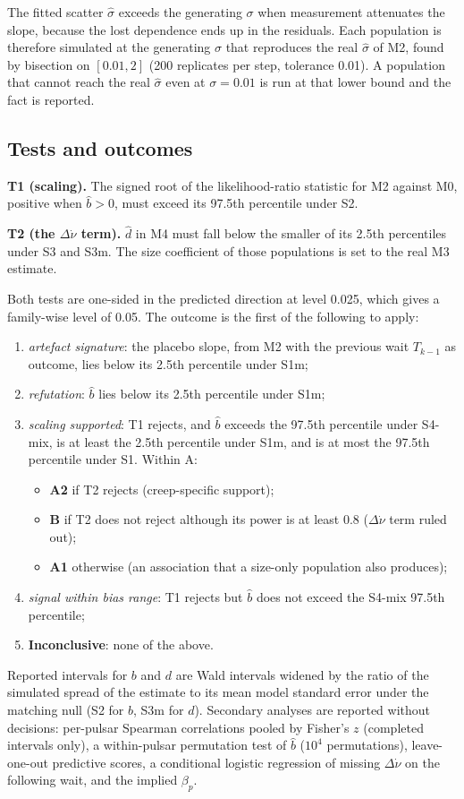 \documentclass[fleqn,usenatbib]{mnras}
\newcommand{\bhat}{\hat b}
\newcommand{\dhat}{\hat d}
\newcommand{\shat}{\hat\sigma}
\begin{document}
The fitted scatter $\shat$ exceeds the generating $\sigma$ when measurement
attenuates the slope, because the lost dependence ends up in the residuals.
Each population is therefore simulated at the generating $\sigma$ that
reproduces the real $\shat$ of M2, found by bisection on $[0.01,2]$ (200
replicates per step, tolerance 0.01). A population that cannot reach the
real $\shat$ even at $\sigma=0.01$ is run at that lower bound and the fact
is reported.

\subsection{Tests and outcomes}\label{sec:rules}
\textbf{T1 (scaling).} The signed root of the likelihood-ratio statistic
for M2 against M0, positive when $\bhat>0$, must exceed its 97.5th
percentile under S2.

\textbf{T2 (the $\Delta\dot\nu$ term).} $\dhat$ in M4 must fall below the
smaller of its 2.5th percentiles under S3 and S3m. The size coefficient of
those populations is set to the real M3 estimate.

Both tests are one-sided in the predicted direction at level 0.025, which
gives a family-wise level of 0.05. The outcome is the first of the
following to apply:
\begin{enumerate}
\item[\textbf{D}] \emph{artefact signature}: the placebo slope, from M2 with
the previous wait $T_{k-1}$ as outcome, lies below its 2.5th percentile
under S1m;
\item[\textbf{C}] \emph{refutation}: $\bhat$ lies below its 2.5th
percentile under S1m;
\item[\textbf{A}] \emph{scaling supported}: T1 rejects, and $\bhat$ exceeds
the 97.5th percentile under S4-mix, is at least the 2.5th percentile under
S1m, and is at most the 97.5th percentile under S1. Within A:
  \begin{itemize}
  \item \textbf{A2} if T2 rejects (creep-specific support);
  \item \textbf{B} if T2 does not reject although its power is at least 0.8
  ($\Delta\dot\nu$ term ruled out);
  \item \textbf{A1} otherwise (an association that a size-only population
  also produces);
  \end{itemize}
\item[\textbf{D}] \emph{signal within bias range}: T1 rejects but $\bhat$
does not exceed the S4-mix 97.5th percentile;
\item[] \textbf{Inconclusive}: none of the above.
\end{enumerate}
Reported intervals for $b$ and $d$ are Wald intervals widened by the ratio
of the simulated spread of the estimate to its mean model standard error
under the matching null (S2 for $b$, S3m for $d$). Secondary analyses are
reported without decisions: per-pulsar Spearman correlations pooled by
Fisher's $z$ (completed intervals only), a within-pulsar permutation test
of $\bhat$ ($10^4$ permutations), leave-one-out predictive scores,
a conditional logistic regression of missing $\Delta\dot\nu$ on the
following wait, and the implied $\beta_p$.
\end{document}
